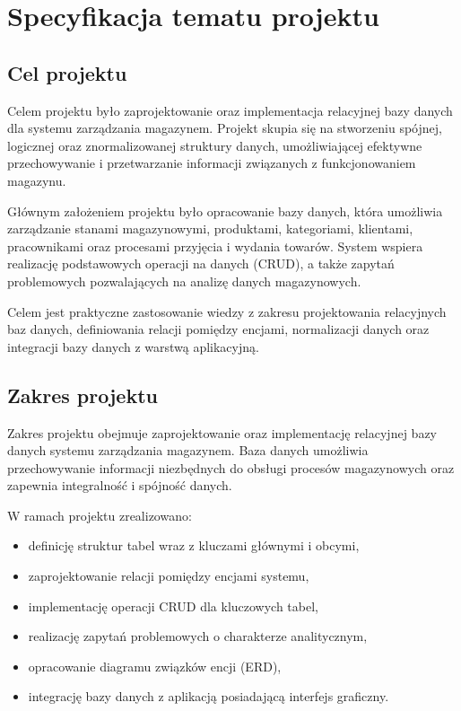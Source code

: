 \chapter{Specyfikacja tematu projektu}

\section{Cel projektu}

Celem projektu było zaprojektowanie oraz implementacja relacyjnej bazy danych
dla systemu zarządzania magazynem.
Projekt skupia się na stworzeniu spójnej, logicznej oraz znormalizowanej struktury
danych, umożliwiającej efektywne przechowywanie i przetwarzanie informacji
związanych z funkcjonowaniem magazynu.

Głównym założeniem projektu było opracowanie bazy danych, która umożliwia
zarządzanie stanami magazynowymi, produktami, kategoriami, klientami,
pracownikami oraz procesami przyjęcia i wydania towarów.
System wspiera realizację podstawowych operacji na danych (CRUD),
a także zapytań problemowych pozwalających na analizę danych magazynowych.

Celem jest praktyczne zastosowanie
wiedzy z zakresu projektowania relacyjnych baz danych, definiowania relacji
pomiędzy encjami, normalizacji danych oraz integracji bazy danych
z warstwą aplikacyjną.


\section{Zakres projektu}

Zakres projektu obejmuje zaprojektowanie oraz implementację relacyjnej bazy danych
systemu zarządzania magazynem.
Baza danych umożliwia przechowywanie informacji niezbędnych do obsługi
procesów magazynowych oraz zapewnia integralność i spójność danych.

W ramach projektu zrealizowano:
\begin{itemize}
    \item definicję struktur tabel wraz z kluczami głównymi i obcymi,
    \item zaprojektowanie relacji pomiędzy encjami systemu,
    \item implementację operacji CRUD dla kluczowych tabel,
    \item realizację zapytań problemowych o charakterze analitycznym,
    \item opracowanie diagramu związków encji (ERD),
    \item integrację bazy danych z aplikacją posiadającą interfejs graficzny.
\end{itemize}

